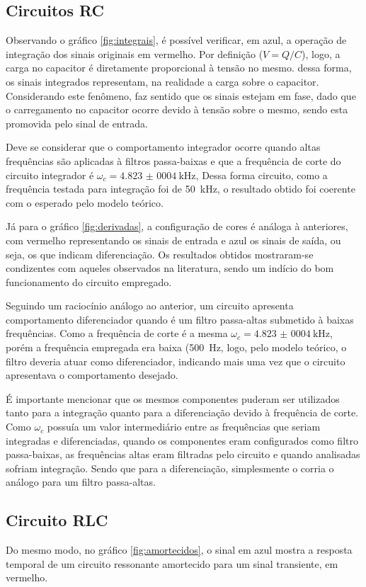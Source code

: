\subsection{Circuitos RC}

Observando o gráfico \ref{fig:integrais}, é possível verificar, em azul, a operação de integração dos sinais originais em vermelho. Por definição ($V=Q/C$), logo, a carga no capacitor é diretamente proporcional à tensão no mesmo. dessa forma, os sinais integrados representam, na realidade a carga sobre o capacitor. Considerando este fenômeno, faz sentido que os sinais estejam em fase, dado que o carregamento no capacitor ocorre devido à tensão sobre o mesmo, sendo esta promovida pelo sinal de entrada.

Deve se considerar que o comportamento integrador ocorre quando altas frequências são aplicadas à filtros passa-baixas e que a frequência de corte do circuito integrador é $\omega_c=\SI{4,823(0004)}{\kilo\hertz}$, Dessa forma circuito, como a frequência testada para integração foi de \SI{50}{\kilo\hertz}, o resultado obtido foi coerente com o esperado pelo modelo teórico.

Já para o gráfico \ref{fig:derivadas}, a configuração de cores é análoga à anteriores, com vermelho representando os sinais de entrada e azul os sinais de saída, ou seja, os que indicam diferenciação. Os resultados obtidos mostraram-se condizentes com aqueles observados na literatura, sendo um indício do bom funcionamento do circuito empregado.

Seguindo um raciocínio análogo ao anterior, um circuito apresenta comportamento diferenciador quando é um filtro passa-altas submetido à baixas frequências. Como a frequência de corte é a mesma $\omega_c=\SI{4,823(0004)}{\kilo\hertz}$, porém a frequência empregada era baixa (\SI{500}{\hertz}, logo, pelo modelo teórico, o filtro deveria atuar como diferenciador, indicando mais uma vez que o circuito apresentava o comportamento desejado.

É importante mencionar que os mesmos componentes puderam ser utilizados tanto para a integração quanto para a diferenciação devido à frequência de corte. Como $\omega_c$ possuía um valor intermediário entre as frequências que seriam integradas e diferenciadas, quando os componentes eram configurados como filtro passa-baixas, as frequências altas eram filtradas pelo circuito e quando analisadas sofriam integração. Sendo que para a diferenciação, simplesmente o corria o análogo para um filtro passa-altas.

\subsection{Circuito RLC}

Do mesmo modo, no gráfico \ref{fig:amortecidos}, o sinal em azul mostra a resposta temporal de um circuito ressonante amortecido para um sinal transiente, em vermelho.
